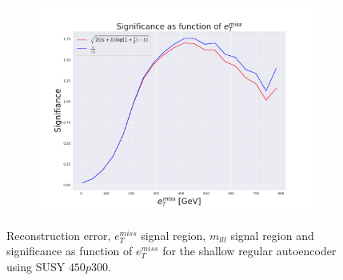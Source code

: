 \begin{figure}[H]
    \hfill  
    \begin{subfigure}{.60\textwidth}
        \includegraphics[width=\textwidth]{Figures/VAE_testing/small/2lep/significance_etmiss_450p0p0300_-0.8484803499636524.pdf}
        \caption{}
        \label{fig:VAE_2lep_small_signi_450}
    \end{subfigure}
    \hfill      
    \caption[2lep shallow network | $450p300$ | VAE]{Reconstruction error, $e_T^{miss}$ signal region, $m_{lll}$ signal region and significance as function of 
    $e_T^{miss}$ for the shallow regular autoencoder using SUSY $450p300$.}
    \label{fig:VAE_2lep_small_rec_sig_signi_450}
\end{figure}



